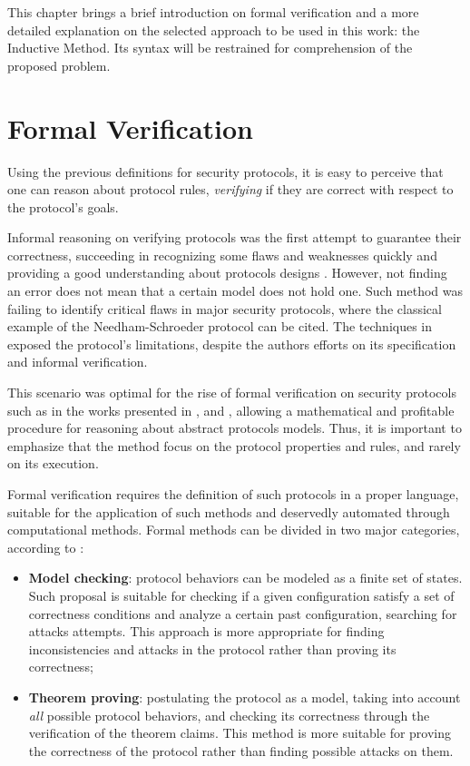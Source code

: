 \label{chap:inductive}
This chapter brings a brief introduction on formal verification and a more detailed explanation on the selected approach to be used in this work: the Inductive Method. Its syntax will be restrained for comprehension of the proposed problem.





\section{Formal Verification}
Using the previous definitions for security protocols, it is easy to perceive that one can reason about protocol rules, \textit{verifying} if they are correct with respect to the protocol's goals.

Informal reasoning on verifying protocols was the first attempt to guarantee their correctness, succeeding in recognizing some flaws and weaknesses quickly and providing a good understanding about protocols designs \cite{bella-book}. However, not finding an error does not mean that a certain model does not hold one. Such method was failing to identify critical flaws in major security protocols, where the classical example of the Needham-Schroeder protocol \cite{needham-schroeder} can be cited. The techniques in \cite{lowe96} exposed the protocol's limitations, despite the authors efforts on its specification and informal verification.

This scenario was optimal for the rise of formal verification on security protocols such as in the works presented in \cite{meadows-old-survey}, \cite{kemmerer-verification} and \cite{ban}, allowing a mathematical and profitable procedure for reasoning about abstract protocols models. Thus, it is important to emphasize that the method focus on the protocol properties and rules, and rarely on its execution.

Formal verification requires the definition of such protocols in a proper language, suitable for the application of such methods and deservedly automated through computational methods. Formal methods can be divided in two major categories, according to \cite{boyd-mathuria}:

\begin{itemize}
  \item \textbf{Model checking}: protocol behaviors can be modeled as a finite set of states. Such proposal is suitable for checking if a given configuration satisfy a set of correctness conditions and analyze a certain past configuration, searching for attacks attempts. This approach is more appropriate for finding inconsistencies and attacks in the protocol rather than proving its correctness;

  \item \textbf{Theorem proving}: postulating the protocol as a model, taking into account \textit{all} possible protocol behaviors, and checking its correctness through the verification of the theorem claims. This method is more suitable for proving the correctness of the protocol rather than finding possible attacks on them.
\end{itemize}

